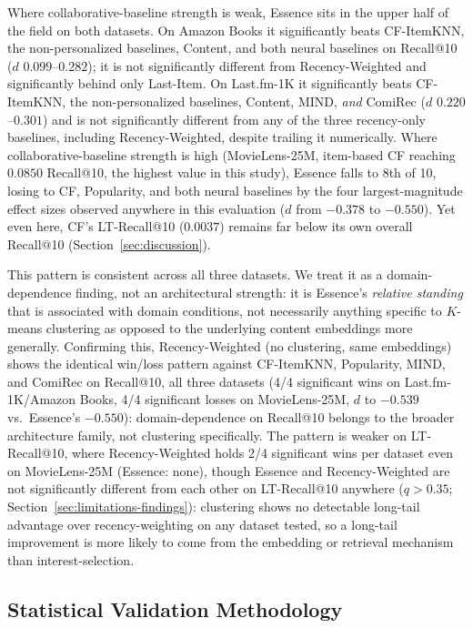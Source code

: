 \documentclass{article}
\begin{document}
Where collaborative-baseline strength is weak, Essence sits in the upper half of the field on both datasets. On Amazon Books it significantly beats CF-ItemKNN, the non-personalized baselines, Content, and both neural baselines on Recall@10 ($d$ $0.099$--$0.282$); it is not significantly different from Recency-Weighted and significantly behind only Last-Item. On Last.fm-1K it significantly beats CF-ItemKNN, the non-personalized baselines, Content, MIND, \emph{and} ComiRec ($d$ $0.220$--$0.301$) and is not significantly different from any of the three recency-only baselines, including Recency-Weighted, despite trailing it numerically. Where collaborative-baseline strength is high (MovieLens-25M, item-based CF reaching $0.0850$ Recall@10, the highest value in this study), Essence falls to 8th of 10, losing to CF, Popularity, and both neural baselines by the four largest-magnitude effect sizes observed anywhere in this evaluation ($d$ from $-0.378$ to $-0.550$). Yet even here, CF's LT-Recall@10 ($0.0037$) remains far below its own overall Recall@10 (Section~\ref{sec:discussion}).

This pattern is consistent across all three datasets. We treat it as a domain-dependence finding, not an architectural strength: it is Essence's \emph{relative standing} that is associated with domain conditions, not necessarily anything specific to $K$-means clustering as opposed to the underlying content embeddings more generally. Confirming this, Recency-Weighted (no clustering, same embeddings) shows the identical win/loss pattern against CF-ItemKNN, Popularity, MIND, and ComiRec on Recall@10, all three datasets (4/4 significant wins on Last.fm-1K/Amazon Books, 4/4 significant losses on MovieLens-25M, $d$ to $-0.539$ vs.\ Essence's $-0.550$): domain-dependence on Recall@10 belongs to the broader architecture family, not clustering specifically. The pattern is weaker on LT-Recall@10, where Recency-Weighted holds 2/4 significant wins per dataset even on MovieLens-25M (Essence: none), though Essence and Recency-Weighted are not significantly different from each other on LT-Recall@10 anywhere ($q>0.35$; Section~\ref{sec:limitations-findings}): clustering shows no detectable long-tail advantage over recency-weighting on any dataset tested, so a long-tail improvement is more likely to come from the embedding or retrieval mechanism than interest-selection.

\subsection{Statistical Validation Methodology}
\label{sec:stats-methodology}
\end{document}
